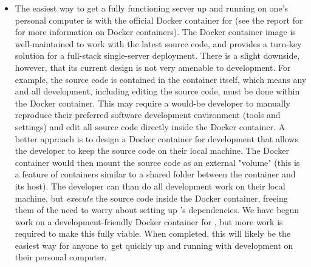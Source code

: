 \documentclass{deliverablereport}
\renewcommand{\SMC}{\software{SMC}}
\begin{document}
\begin{itemize}
    \item The easiest way to get a fully functioning \SMC server up and running
        on one's personal computer is with the official Docker container for
        \SMC (see the report for
         for more
        information on Docker containers).  The Docker container image is
        well-maintained to work with the latest \SMC source code, and provides a
        turn-key solution for a full-stack single-server \SMC deployment.  There
        is a slight downside, however, that its current design is not very
        amenable to development.  For example, the \SMC source code is contained
        in the container itself, which means any and all development, including
        editing the source code, must be done within the Docker container.
        This may require a would-be developer to manually reproduce their
        preferred software development environment (tools and settings) and
        edit all source code directly inside the Docker container.  A better
        approach is to design a Docker container for development that allows
        the developer to keep the \SMC source code on their local machine.  The
        \SMC Docker container would then mount the source code as an external
        "volume" (this is a feature of containers similar to a shared folder
        between the container and its host).  The developer can than do all
        development work on their local machine, but \emph{execute} the source
        code inside the Docker container, freeing them of the need to worry
        about setting up \SMC's dependencies.  We have begun work on a
        development-friendly Docker container for \SMC, but more work is
        required to make this fully viable.  When completed, this will likely be
        the easiest way for anyone to get quickly up and running with \SMC
        development on their personal computer.

\end{itemize}
\end{document}
